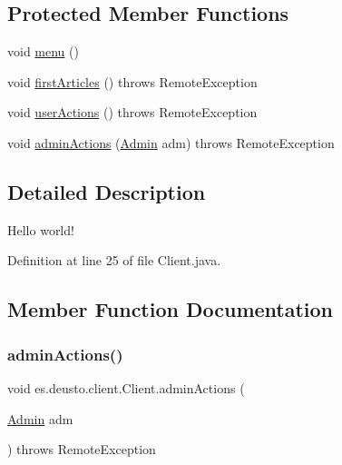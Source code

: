 \subsection*{Protected Member Functions}
\begin{DoxyCompactItemize}
\item 
void \hyperlink{classes_1_1deusto_1_1client_1_1_client_a8fdee4eb01bf96421c91a0bc1fbdcb43}{menu} ()
\item 
void \hyperlink{classes_1_1deusto_1_1client_1_1_client_a1872e2d941c7f50c6cc13d80e8d28eef}{first\+Articles} ()  throws Remote\+Exception 
\item 
void \hyperlink{classes_1_1deusto_1_1client_1_1_client_a08731e01aee74e27a7a55ae48c636c84}{user\+Actions} ()  throws Remote\+Exception 
\item 
void \hyperlink{classes_1_1deusto_1_1client_1_1_client_aee57ed402853cda15cc53f102d6abf1c}{admin\+Actions} (\hyperlink{classes_1_1deusto_1_1server_1_1jdo_1_1_admin}{Admin} adm)  throws Remote\+Exception 
\end{DoxyCompactItemize}


\subsection{Detailed Description}
Hello world! 

Definition at line 25 of file Client.\+java.



\subsection{Member Function Documentation}
\mbox{\label{classes_1_1deusto_1_1client_1_1_client_aee57ed402853cda15cc53f102d6abf1c}} 
\subsubsection{\texorpdfstring{admin\+Actions()}{adminActions()}}
{\footnotesize\ttfamily void es.\+deusto.\+client.\+Client.\+admin\+Actions (\begin{DoxyParamCaption}\item[{\hyperlink{classes_1_1deusto_1_1server_1_1jdo_1_1_admin}{Admin}}]{adm }\end{DoxyParamCaption}) throws Remote\+Exception\hspace{0.3cm}{\ttfamily [protected]}}



